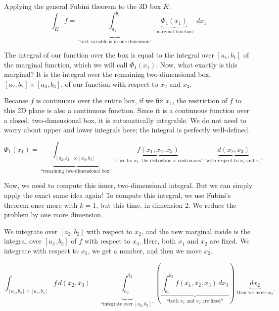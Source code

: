\begin{math-stroke}[First Dimensional Split ($k=1$)]
Applying the general Fubini theorem to the 3D box $K$:
\[
\int_K f = \underbrace{\int_{a_1}^{b_1}}_{\text{``first variable is in one dimension''}} \underbrace{\Phi_1(x_1)}_{\text{``marginal function''}} \, dx_1
\]
\end{math-stroke}

\begin{spoken-clean}[24:15 - 26:10]
The integral of our function over the box is equal to the integral over $[a_1, b_1]$ of the marginal function, which we will call $\Phi_1(x_1)$. Now, what exactly is this marginal? It is the integral over the remaining two-dimensional box, $[a_2, b_2] \times [a_3, b_3]$, of our function with respect to $x_2$ and $x_3$. 

Because $f$ is continuous over the entire box, if we fix $x_1$, the restriction of $f$ to this 2D plane is also a continuous function. Since it is a continuous function over a closed, two-dimensional box, it is automatically integrable. We do not need to worry about upper and lower integrals here; the integral is perfectly well-defined.
\end{spoken-clean}

\begin{math-stroke}
\[
\Phi_1(x_1) = \underbrace{\int_{[a_2, b_2] \times [a_3, b_3]}}_{\text{``remaining two-dimensional box''}} \underbrace{f(x_1, x_2, x_3)}_{\text{``if we fix } x_1 \text{, the restriction is continuous''}} \, \underbrace{d(x_2, x_3)}_{\text{``with respect to } x_2 \text{ and } x_3 \text{''}}
\]
\end{math-stroke}

\begin{spoken-clean}[26:10 - 28:00]
Now, we need to compute this inner, two-dimensional integral. But we can simply apply the exact same idea again! To compute this integral, we use Fubini's theorem once more with $k = 1$, but this time, in dimension 2. We reduce the problem by one more dimension. 

We integrate over $[a_2, b_2]$ with respect to $x_2$, and the new marginal inside is the integral over $[a_3, b_3]$ of $f$ with respect to $x_3$. Here, both $x_1$ and $x_2$ are fixed. We integrate with respect to $x_3$, we get a number, and then we move $x_2$. 
\end{spoken-clean}

\begin{math-stroke}
\[
\int_{[a_2, b_2] \times [a_3, b_3]} f \, d(x_2, x_3) = \underbrace{\int_{a_2}^{b_2}}_{\text{``integrate over } [a_2, b_2] \text{''}} \left( \underbrace{\int_{a_3}^{b_3} f(x_1, x_2, x_3) \, dx_3}_{\text{``both } x_1 \text{ and } x_2 \text{ are fixed''}} \right) \underbrace{dx_2}_{\text{``then we move } x_2 \text{''}}
\]
\end{math-stroke}

